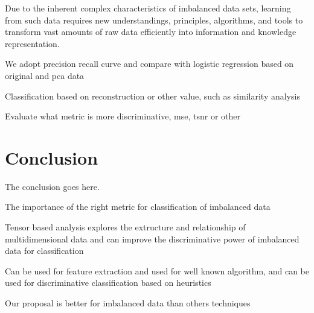 Due to the inherent complex characteristics of imbalanced data sets, learning from such data requires new understandings, principles, algorithms, and tools to transform vast amounts of raw data efficiently into information and knowledge representation.

We adopt precision recall curve and compare with logistic regression based on original and pca data

Classification based on reconstruction or other value, such as similarity analysis

Evaluate what metric is more discriminative, mse, tsnr or other

\section{Conclusion}

The conclusion goes here.

The importance of the right metric for classification of imbalanced data

Tensor based analysis explores the extructure and relationship of multidimensional data and can improve the discriminative power of imbalanced data for classification

Can be used for feature extraction and used for well known algorithm,  and can be used for discriminative classification based on heuristics

Our proposal is better for imbalanced data than others techniques